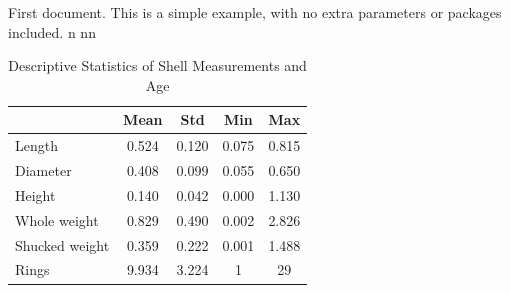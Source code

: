 \documentclass{article}
\begin{document}
First document. This is a simple example, with no 
extra parameters or packages included.
n nn
\begin{table}[h]
    \centering
    \caption{Descriptive Statistics of Shell Measurements and Age}
    \label{tab:desc_stats}
    \begin{tabular}{lcccc}
        \hline
        & Mean & Std & Min & Max \\
        \hline
        Length & 0.524 & 0.120 & 0.075 & 0.815 \\
        Diameter & 0.408 & 0.099 & 0.055 & 0.650 \\
        Height & 0.140 & 0.042 & 0.000 & 1.130 \\
        Whole weight & 0.829 & 0.490 & 0.002 & 2.826 \\
        Shucked weight & 0.359 & 0.222 & 0.001 & 1.488 \\
        Rings & 9.934 & 3.224 & 1 & 29 \\
        \hline
    \end{tabular}
\end{table}
\end{document}
